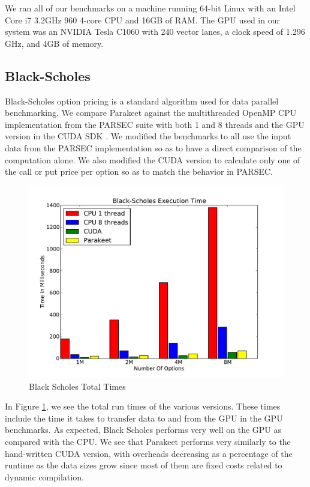 \documentclass[10pt,twocolumn]{article}
\begin{document}
We ran all of our benchmarks on a machine running 64-bit Linux with an Intel Core i7 3.2GHz 960 4-core CPU  and 16GB of RAM.  The GPU used in our system was an NVIDIA Tesla C1060 with 240 vector lanes, a clock speed of 1.296 GHz, and 4GB of memory.

\subsection{Black-Scholes}
\label{results-bs}

Black-Scholes option pricing \cite{Blac73} is a standard algorithm used for data parallel benchmarking.  We compare Parakeet against the multithreaded OpenMP CPU implementation from the PARSEC \cite{Bien08} suite with both 1 and 8 threads and the GPU version in the CUDA SDK \cite{NvidSD}.  We modified the benchmarks to all use the input data from the PARSEC implementation so as to have a direct comparison of the computation alone.  We also modified the CUDA version to calculate only one of the call or put price per option so as to match the behavior in PARSEC.

\begin{figure}[h!]
\includegraphics[scale=0.4]{BSWCPU.pdf}
\caption{Black Scholes Total Times}
\label{BSCPU}
\end{figure}

In Figure \ref{BSCPU}, we see the total run times of the various versions. These times include the time it takes to transfer data to and from the GPU in the GPU benchmarks.  As expected, Black Scholes performs very well on the GPU as compared with the CPU.  We see that Parakeet performs very similarly to the hand-written CUDA version, with overheads decreasing as a percentage of the runtime as the data sizes grow since most of them are fixed costs related to dynamic compilation.
\end{document}
